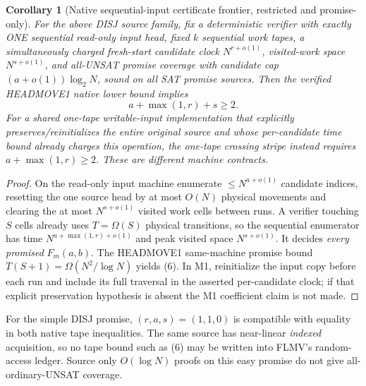 \documentclass[11pt]{article}
\newtheorem{corollary}[theorem]{Corollary}
\begin{document}
\begin{corollary}[Native sequential-input certificate frontier,
restricted and promise-only]
\label{co:tape}
For the above DISJ source family, fix a deterministic verifier
with exactly ONE sequential read-only input head, fixed $k$
sequential work tapes, a simultaneously charged fresh-start
candidate clock $N^{r+o(1)}$, visited-work space $N^{s+o(1)}$,
and all-UNSAT \emph{promise} coverage with candidate cap
$(a+o(1))\log_2N$, sound on all SAT promise sources.
Then the verified HEADMOVE1 native lower bound implies
\[
 \boxed{\ a+\max(1,r)+s\ge2. \ }                      \tag{6}
\]
For a shared one-tape writable-input implementation that
explicitly preserves/reinitializes the entire original source
and whose per-candidate time bound already charges this
operation, the one-tape crossing stripe instead requires
$a+\max(1,r)\ge2$. These are \emph{different} machine contracts.
\end{corollary}
\begin{proof}
On the read-only input machine enumerate $\le N^{a+o(1)}$
candidate indices, resetting the one source head by at most
$O(N)$ physical movements and clearing the at most
$N^{s+o(1)}$ visited work cells between runs.
A verifier touching $S$ cells already uses $T=\Omega(S)$
physical transitions, so the sequential enumerator has
time $N^{a+\max(1,r)+o(1)}$ and peak visited space
$N^{s+o(1)}$. It decides \emph{every promised} $F_m(a,b)$.
The HEADMOVE1 same-machine promise bound
$T(S+1)=\Omega(N^2/\log N)$ yields (6).
In M1, reinitialize the input copy before each run and
include its full traversal in the asserted per-candidate
clock; if that explicit preservation hypothesis is absent
the M1 coefficient claim is not made.
\end{proof}

For the simple DISJ promise, $(r,a,s)=(1,1,0)$ is compatible
with equality in both native tape inequalities.
The same source has near-linear \emph{indexed} acquisition,
so no tape bound such as (6) may be written into FLMV's
random-access ledger. Source only $O(\log N)$ proofs on this
easy promise do not give all-ordinary-UNSAT coverage.
\end{document}
